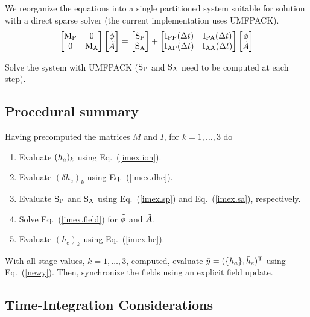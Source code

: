 We reorganize the equations into a single partitioned system
suitable for solution with a direct sparse solver (the 
current implementation uses UMFPACK).
%
\begin{equation}
\begin{bmatrix} {{\rm M}_{\rm P}} & 0 \\ 0 & {\rm M}_{\rm A} \end{bmatrix}
\begin{bmatrix} \tilde{\phi} \\ \tilde{A} \end{bmatrix}
=
\begin{bmatrix} {\rm S}_{\rm P} \\ {\rm S}_{\rm A} \end{bmatrix}
+
\begin{bmatrix} {\rm I}_{\rm PP}({\Delta t}) & {\rm I}_{\rm PA}({\Delta t}) \\ 
                {\rm I}_{\rm AP}({\Delta t}) & {\rm I}_{\rm AA}({\Delta t})  \end{bmatrix}
\begin{bmatrix} \tilde{\phi} \\ \tilde{A} \end{bmatrix}
\label{imex.field}
\end{equation}

Solve the system with UMFPACK (${\rm S}_{\rm P}$ and ${\rm S}_{\rm A}$ need 
to be computed at each step). 

\subsection{Procedural summary}

Having precomputed the matrices $M$ and $I$, for 
$k=1,\ldots,3$ do
%
\begin{enumerate}
\item
Evaluate $(h_a)_k$ using Eq.~(\ref{imex.ion}).
\item
Evaluate $(\delta h_e)_k$ using Eq.~(\ref{imex.dhe}).
\item
Evaluate ${\rm S}_{\rm P}$ and ${\rm S}_{\rm A}$ using Eq.~(\ref{imex.sp}) 
and Eq.~(\ref{imex.sa}), respectively.
\item
Solve Eq.~(\ref{imex.field}) for $\tilde{\phi}$ and $\tilde{A}$.
\item
Evaluate $(h_e)_k$ using Eq.~(\ref{imex.he}). 
\end{enumerate}

With all stage values, $k=1,\ldots,3$, computed, 
evaluate ${\bar y} = ({\bar \{h_a\}},{\bar h_e})^{\rm T}$ 
using Eq.~(\ref{newy}).  Then, synchronize the fields 
using an explicit field update.

\subsection{Time-Integration Considerations}

